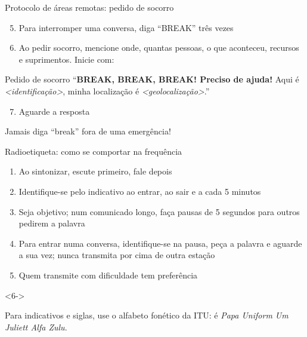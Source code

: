 \begin{frame}{Protocolo de áreas remotas: pedido de socorro}
  \begin{enumerate}
  \setcounter{enumi}{4}
  \item Para interromper uma conversa, diga ``\alert{BREAK}'' três vezes
  \item Ao pedir socorro, mencione \alert{onde, quantas pessoas, o que aconteceu, recursos e suprimentos}. Inicie com:
  \end{enumerate}

  \begin{alertblock}{Pedido de socorro}
    \centering
    ``\textbf{BREAK, BREAK, BREAK! Preciso de ajuda!} Aqui é \textit{\textless identificação\textgreater}, minha localização é \textit{\textless geolocalização\textgreater}.''
  \end{alertblock}

  \begin{enumerate}
  \setcounter{enumi}{6}
  \item Aguarde a resposta
  \end{enumerate}

  \pause
  \begin{atencao}
    Jamais diga ``break'' fora de uma emergência!
  \end{atencao}
\end{frame}

\begin{frame}{Radioetiqueta: como se comportar na frequência}
  \begin{enumerate}
  \item Ao sintonizar, \alert<1>{escute primeiro}, fale depois
  \item \alert<2>{Identifique-se} pelo indicativo ao entrar, ao sair e a cada 5 minutos
  \item Seja objetivo; num comunicado longo, faça \alert<3>{pausas de 5 segundos} para outros
    pedirem a palavra
  \item Para entrar numa conversa, \alert<4>{identifique-se na pausa}, peça a palavra e aguarde a sua vez;
    nunca transmita por cima de outra estação
  \item Quem transmite com dificuldade tem \alert<5>{preferência}
  \end{enumerate}

  \begin{uncoverenv}<6->
    \begin{dica}
      Para indicativos e siglas, use o \alert{alfabeto fonético da ITU}:
       é \emph{Papa Uniform Um Juliett Alfa Zulu}.
    \end{dica}
  \end{uncoverenv}
  \vspace{-1ex}\raggedleft
\end{frame}

